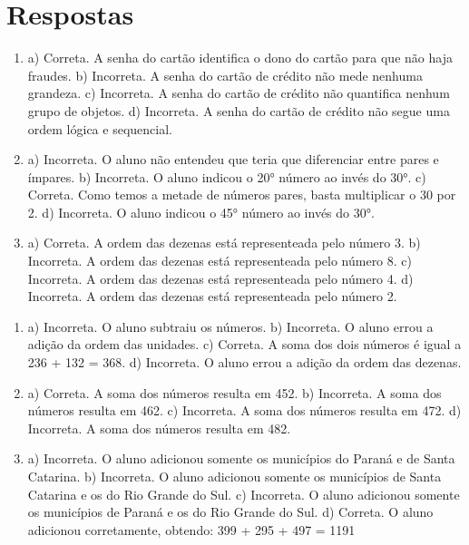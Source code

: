 \chapter{Respostas}
\pagestyle{plain}
\footnotesize

\pagecolor{gray!40}


\begin{enumerate}
\item
a) Correta. A senha do cartão identifica o dono do cartão para que não haja fraudes.
b) Incorreta. A senha do cartão de crédito não mede nenhuma grandeza.
c) Incorreta. A senha do cartão de crédito não quantifica nenhum grupo de objetos.
d) Incorreta. A senha do cartão de crédito não segue uma ordem lógica e sequencial.

\item
a) Incorreta. O aluno não entendeu que teria que diferenciar entre pares e ímpares.
b) Incorreta. O aluno indicou o 20° número ao invés do 30°.
c) Correta. Como temos a metade de números pares, basta multiplicar o 30 por 2.
d) Incorreta. O aluno indicou o 45° número ao invés do 30°.

\item
a) Correta. A ordem das dezenas está representeada pelo número 3.
b) Incorreta. A ordem das dezenas está representeada pelo número 8.
c) Incorreta. A ordem das dezenas está representeada pelo número 4.
d) Incorreta. A ordem das dezenas está representeada pelo número 2.
\end{enumerate}


\begin{enumerate}
\item
a) Incorreta. O aluno subtraiu os números.
b) Incorreta. O aluno errou a adição da ordem das unidades.
c) Correta. A soma dos dois números é igual a 236 + 132 = 368.
d) Incorreta. O aluno errou a adição da ordem das dezenas.

\item
a) Correta. A soma dos números resulta em 452.
b) Incorreta. A soma dos números resulta em 462.
c) Incorreta. A soma dos números resulta em 472.
d) Incorreta. A soma dos números resulta em 482.

\item
a) Incorreta. O aluno adicionou somente os municípios do Paraná e de Santa Catarina.
b) Incorreta. O aluno adicionou somente os municípios de Santa Catarina e os do Rio Grande do Sul.
c) Incorreta. O aluno adicionou somente os municípios de Paraná e os do Rio Grande do Sul.
d) Correta. O aluno adicionou corretamente, obtendo: 399 + 295 + 497 = 1191
\end{enumerate}

